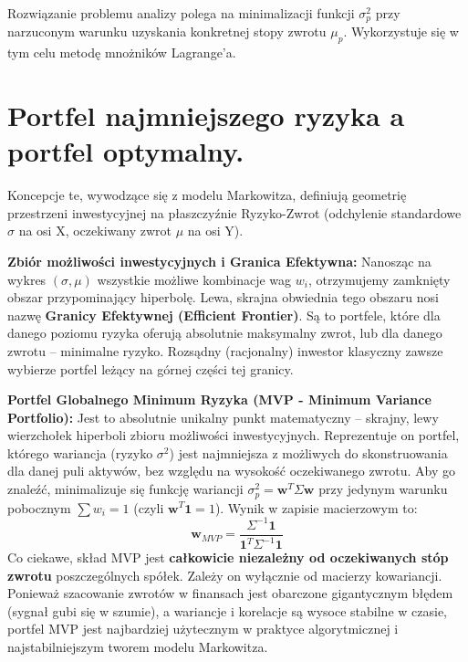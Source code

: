 \documentclass[11pt, a4paper]{article}
\begin{document}
Rozwiązanie problemu analizy polega na minimalizacji funkcji $\sigma_p^2$ przy narzuconym warunku uzyskania konkretnej stopy zwrotu $\mu_p$. Wykorzystuje się w tym celu metodę mnożników Lagrange'a.

\section{Portfel najmniejszego ryzyka a portfel optymalny.}

Koncepcje te, wywodzące się z modelu Markowitza, definiują geometrię przestrzeni inwestycyjnej na płaszczyźnie Ryzyko-Zwrot (odchylenie standardowe $\sigma$ na osi X, oczekiwany zwrot $\mu$ na osi Y).

\textbf{Zbiór możliwości inwestycyjnych i Granica Efektywna:}
Nanosząc na wykres $(\sigma, \mu)$ wszystkie możliwe kombinacje wag $w_i$, otrzymujemy zamknięty obszar przypominający hiperbolę. Lewa, skrajna obwiednia tego obszaru nosi nazwę \textbf{Granicy Efektywnej (Efficient Frontier)}. Są to portfele, które dla danego poziomu ryzyka oferują absolutnie maksymalny zwrot, lub dla danego zwrotu – minimalne ryzyko. Rozsądny (racjonalny) inwestor klasyczny zawsze wybierze portfel leżący na górnej części tej granicy.

\textbf{Portfel Globalnego Minimum Ryzyka (MVP - Minimum Variance Portfolio):}
Jest to absolutnie unikalny punkt matematyczny – skrajny, lewy wierzchołek hiperboli zbioru możliwości inwestycyjnych. Reprezentuje on portfel, którego wariancja (ryzyko $\sigma^2$) jest najmniejsza z możliwych do skonstruowania dla danej puli aktywów, bez względu na wysokość oczekiwanego zwrotu. 
Aby go znaleźć, minimalizuje się funkcję wariancji $\sigma_p^2 = \mathbf{w}^T \Sigma \mathbf{w}$ przy jedynym warunku pobocznym $\sum w_i = 1$ (czyli $\mathbf{w}^T \mathbf{1} = 1$). Wynik w zapisie macierzowym to:
\[
\mathbf{w}_{MVP} = \frac{\Sigma^{-1} \mathbf{1}}{\mathbf{1}^T \Sigma^{-1} \mathbf{1}}
\]
Co ciekawe, skład MVP jest \textbf{całkowicie niezależny od oczekiwanych stóp zwrotu} poszczególnych spółek. Zależy on wyłącznie od macierzy kowariancji. Ponieważ szacowanie zwrotów w finansach jest obarczone gigantycznym błędem (sygnał gubi się w szumie), a wariancje i korelacje są wysoce stabilne w czasie, portfel MVP jest najbardziej użytecznym w praktyce algorytmicznej i najstabilniejszym tworem modelu Markowitza.
\end{document}

